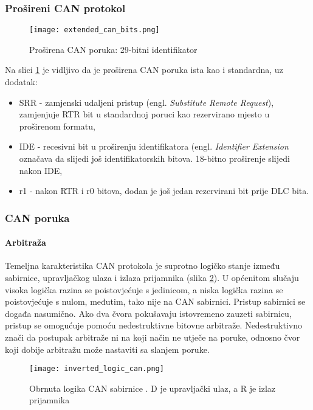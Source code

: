 \subsubsection{Prošireni CAN protokol}

\begin{figure}[H]
	\centering
	\texttt{[image: extended\_can\_bits.png]}
	\caption{Proširena CAN poruka: 29-bitni identifikator \cite[str. 4]{can_manual}}
	\label{fig:extended_can_bits}
\end{figure}
Na slici \ref{fig:extended_can_bits} je vidljivo da je proširena CAN poruka ista kao i standardna, uz dodatak:
\begin{itemize}
	\item SRR - zamjenski udaljeni pristup (engl. \textit{Substitute Remote Request}), zamjenjuje RTR bit u standardnoj poruci kao rezervirano mjesto u proširenom formatu,
	\item IDE - recesivni bit u proširenju identifikatora (engl. \textit{Identifier Extension} označava da slijedi još identifikatorskih bitova. 18-bitno proširenje slijedi nakon IDE,
	\item r1 - nakon RTR i r0 bitova, dodan je još jedan rezervirani bit prije DLC bita.
\end{itemize}

\subsubsection{CAN poruka}

\paragraph{Arbitraža}

Temeljna karakteristika CAN protokola je suprotno logičko stanje između sabirnice, upravljačkog ulaza i izlaza prijamnika (slika \ref{fig:inverted_logic_can}). U općenitom slučaju visoka logička razina se poistovjećuje s jedinicom, a niska logička razina se poistovjećuje s nulom, međutim, tako nije na CAN sabirnici. Pristup sabirnici se događa nasumično. Ako dva čvora pokušavaju istovremeno zauzeti sabirnicu, pristup se omogućuje pomoću nedestruktivne bitovne arbitraže. Nedestruktivno znači da postupak arbitraže ni na koji način ne utječe na poruke, odnosno čvor koji dobije arbitražu može nastaviti sa slanjem poruke.

\begin{figure}[H]
	\centering
	\texttt{[image: inverted\_logic\_can.png]}
	\caption{Obrnuta logika CAN sabirnice \cite[str. 4]{can_manual}. D je upravljački ulaz, a R je izlaz prijamnika}
	\label{fig:inverted_logic_can}
\end{figure}

